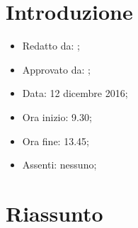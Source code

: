 \section{Introduzione}

	\begin{itemize}
		\item Redatto da: ;
		\item Approvato da: \NS;
		\item Data: 12 dicembre 2016;
		\item Ora inizio: 9.30;
		\item Ora fine: 13.45;
		\item Assenti: nessuno;		
	\end{itemize}

\section{Riassunto}
